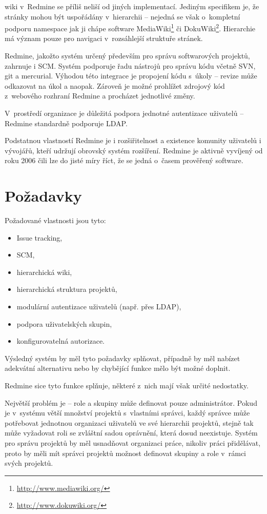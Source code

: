 \documentclass[thesis=B,czech]{FITthesis}[2012/05/02]
\begin{document}
\Gls{wiki} v~Redmine se příliš neliší od jiných implementací. Jediným
specifikem je, že stránky mohou být uspořádány v~hierarchii -- nejedná
se však o~kompletní podporu \gls{namespace} jak ji chápe software
MediaWiki\footnote{\url{http://www.mediawiki.org/}} či
DokuWiki\footnote{\url{http://www.dokuwiki.org/}}. Hierarchie má význam
pouze pro navigaci v~rozsáhlejší struktuře stránek.

Redmine, jakožto systém určený především pro správu softwarových
projektů, zahrnuje i \gls{SCM}. Systém podporuje řadu nástrojů pro
správu kódu včetně \gls{SVN}, \gls{git} a \gls{mercurial}. Výhodou této
integrace je propojení kódu s~úkoly -- revize může odkazovat na úkol a
naopak. Zároveň je možné prohlížet zdrojový kód z~webového rozhraní
Redmine a procházet jednotlivé změny.

V~prostředí organizace je důležitá podpora jednotné autentizace
uživatelů -- Redmine standardně podporuje \gls{LDAP}.

Podstatnou vlastností Redmine je i rozšiřitelnost a existence komunity
uživatelů i vývojářů, kteří udržují obrovský systém rozšíření. Redmine
je aktivně vyvíjený od roku 2006 čili lze do jisté míry říct, že se
jedná o~časem prověřený software.

\section{Požadavky}

Požadované vlastnosti jsou tyto:

\begin{itemize}
\item
  Issue tracking,
\item
  \gls{SCM},
\item
  hierarchická wiki,
\item
  hierarchická struktura projektů,
\item
  modulární autentizace uživatelů (např. přes \gls{LDAP}),
\item
  podpora uživatelských skupin,
\item
  konfigurovatelná autorizace.
\end{itemize}
Výsledný systém by měl tyto požadavky splňovat, případně by měl nabízet
adekvátní alternativu nebo by chybějící funkce mělo být možné doplnit.

Redmine sice tyto funkce splňuje, některé z~nich mají však určité
nedostatky.

Největší problém je  -- role a skupiny může definovat
pouze administrátor. Pokud je v~systému větší množství projektů
s~vlastními správci, každý správce může potřebovat jednotnou organizaci
uživatelů ve své hierarchii projektů, stejně tak může vyžadovat roli se
zvláštní sadou oprávnění, která dosud neexistuje. Systém pro správu
projektů by měl usnadňovat organizaci práce, nikoliv práci přidělávat,
proto by měli mít správci projektů možnost definovat skupiny a role
v~rámci svých projektů.
\end{document}
